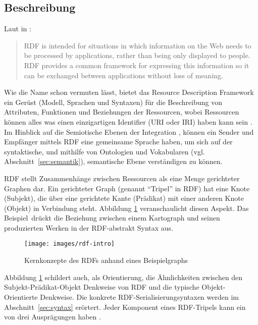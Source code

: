 \subsection{Beschreibung} 
Laut \citeauthor{Schreiber:14:RP} in : \hyphenblockquote{german}{RDF is intended for situations in which information on the Web needs to be processed by applications, rather than being only displayed to people. RDF provides a common framework for expressing this information so it can be exchanged between applications without loss of meaning.} Wie die Name schon vermuten lässt, bietet das Resource Description Framework ein Gerüst (Modell, Sprachen und Syntaxen) für die Beschreibung von Attributen, Funktionen und Beziehungen der Ressourcen, wobei Ressourcen können alles was einen einzigartigen Identifier (URI oder IRI) haben kann sein \parencite[vgl.][Folie~6]{Dekeyzer2013}. Im Hinblick auf die Semiotische Ebenen der Integration \parencite[vgl.]{Schissler2004}, können ein Sender und Empfänger mittels RDF eine gemeinsame Sprache haben, um sich auf der syntaktische, und mithilfe von Ontologien und Vokabularen (vgl. Abschnitt~\ref{sec:semantik}), semantische Ebene verständigen zu können. 

RDF stellt Zusammenhänge zwischen Ressourcen als eine Menge gerichteter Graphen dar. Ein gerichteter Graph (genannt \hyphenquote{german}{Tripel} in RDF) hat eine Knote (Subjekt), die über eine gerichtete Kante (Prädikat) mit einer anderen Knote (Objekt) in Verbindung steht. Abbildung \ref{fig:rdf-intro} veranschaulicht diesen Aspekt. Das Beispiel\footnotemark~drückt die Beziehung zwischen einem Kartograph und seinen produzierten Werken in der RDF-abstrakt Syntax aus.

\begin{figure}[h]
	\centering
	\texttt{[image: images/rdf-intro]}
	\caption[Kernkonzepte des RDFs]{Kernkonzepte des RDFs anhand eines Beispielgraphs}
	\label{fig:rdf-intro}
\end{figure}

Abbildung \ref{fig:rdf-intro} schildert auch, als Orientierung, die Ähnlichkeiten zwischen den Subjekt-Prädikat-Objekt Denkweise von RDF und die typische Objekt-Orientierte Denkweise. Die konkrete RDF-Serialisierungsyntaxen werden im Abschnitt~\ref{sec:syntax} erörtert. Jeder Komponent eines RDF-Tripels kann ein von drei Ausprägungen haben \parencite[vgl.][Abs.~3,1]{Wood:14:RCA}.


